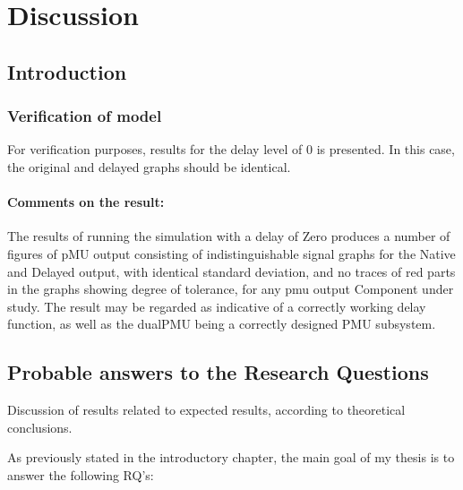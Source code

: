 \chapter{Discussion} \label{chap:Discussions}



\section{Introduction}


\subsection{Verification of model}

For verification purposes, results for the delay level of 0 is presented.  In this case, the original and delayed graphs should be identical.
\subsubsection{Comments on the result:}
The results of running the simulation with a delay of Zero produces a number of figures of pMU output consisting of indistinguishable signal graphs for the Native and Delayed output, with identical standard deviation, and no traces of red parts in the graphs showing degree of tolerance, for any \acrshort{pmu} output Component under study. The result may be regarded as indicative of a correctly working delay function, as well as the dualPMU being a correctly designed PMU subsystem. 




\section{Probable answers to the Research Questions}

Discussion of results related to expected results, according to theoretical conclusions.




As previously stated in the introductory chapter, the main goal of my thesis is to answer the following RQ's: 

